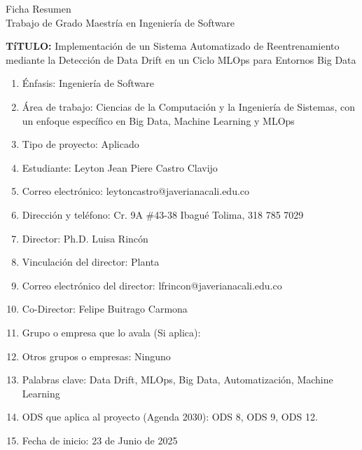 \thispagestyle{empty}
\begin{center}
    \Large{Ficha Resumen \\ Trabajo de Grado Maestría en Ingeniería de Software}
\end{center}

\textbf{TíTULO:} {Implementación de un Sistema Automatizado de Reentrenamiento mediante la Detección de Data Drift en un Ciclo MLOps para Entornos Big Data}
\begin{enumerate}
    \item Énfasis: Ingeniería de Software
    \item Área de trabajo: Ciencias de la Computación y la Ingeniería de Sistemas, con un enfoque específico en Big Data, Machine Learning y MLOps 
    \item Tipo de proyecto: Aplicado
    \item Estudiante: Leyton Jean Piere Castro Clavijo
    \item Correo electrónico: leytoncastro@javerianacali.edu.co
    \item Dirección y teléfono: Cr. 9A \#43-38 Ibagué \- Tolima, 318 785 7029
    \item Director: Ph.D. Luisa Rincón
    \item Vinculación del director: Planta
    \item Correo electrónico del director: lfrincon@javerianacali.edu.co
    \item Co-Director: Felipe Buitrago Carmona
    \item Grupo o empresa que lo avala (Si aplica):
    \item Otros grupos o empresas: Ninguno
    \item Palabras clave: Data Drift, MLOps, Big Data, Automatización, Machine Learning
    \item ODS que aplica al proyecto (Agenda 2030): ODS 8, ODS 9, ODS 12.
    \item Fecha de inicio: 23 de Junio de 2025

\end{enumerate}
